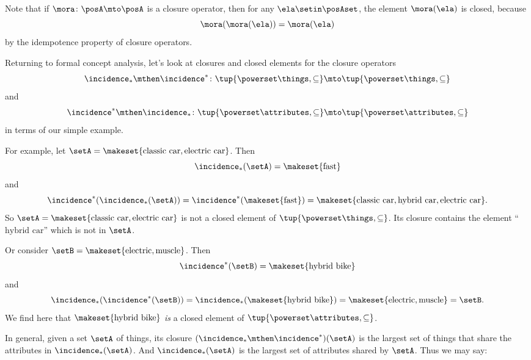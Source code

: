\begin{remark}
Note that if $\mora \colon \posA \mto \posA$ is a closure operator, then for any $\ela \setin \posAset$, the element $\mora(\ela)$ is closed, because
\begin{equation}
\mora(\mora(\ela)) = \mora(\ela)
\end{equation}
by the idempotence property of closure operators. 
\end{remark}

Returning to formal concept analysis, let's look at closures and closed elements for the closure operators 
$$\incidence_* \mthen \incidence^* \colon \tup{\powerset \things, \subseteq} \mto \tup{\powerset \things, \subseteq}$$  
and 
$$\incidence^* \mthen \incidence_* \colon \tup{\powerset \attributes, \subseteq} \mto \tup{\powerset \attributes, \subseteq}$$ 
in terms of our simple example. 

For example, let $\setA = \makeset{\text{classic car}, \text{electric car}}$. Then 
\begin{equation}
\incidence_*(\setA) = \makeset{\text{fast}}
\end{equation}
and 
\begin{equation}
\incidence^*(\incidence_*(\setA)) = \incidence^*(\makeset{\text{fast}}) = \makeset{\text{classic car}, \text{hybrid car}, \text{electric car}}.
\end{equation}
So $\setA = \makeset{\text{classic car}, \text{electric car}}$ is not a closed element of $\tup{\powerset \things, \subseteq}$. Its closure contains the element ``$\text{hybrid car}$'' which is not in $\setA$.

Or consider $\setB = \makeset{\text{electric}, \text{muscle}}$. Then
\begin{equation}
\incidence^*(\setB) = \makeset{\text{hybrid bike}}
\end{equation}
and 
\begin{equation}
\incidence_*(\incidence^*(\setB)) = \incidence_*(\makeset{\text{hybrid bike}}) = \makeset{\text{electric}, \text{muscle}} = \setB.
\end{equation}
We find here that $\makeset{\text{hybrid bike}}$ \emph{is} a closed element of $\tup{\powerset \attributes, \subseteq}$. 

In general, given a set $\setA$ of things, its closure $(\incidence_* \mthen \incidence^*)(\setA)$ is the largest set of things that share the attributes in $\incidence_*(\setA)$. And $\incidence_*(\setA)$ is the largest set of attributes shared by $\setA$. Thus we may say:

